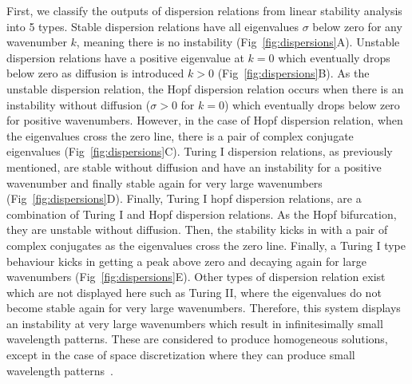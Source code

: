 First, we classify the outputs of dispersion relations from linear stability analysis into 5 types.
Stable dispersion relations have all eigenvalues $\sigma$ below zero for any wavenumber $k$, meaning there is no instability (Fig~\ref{fig:dispersions}A).
Unstable dispersion relations have a positive eigenvalue at $k=0$ which eventually drops below zero as diffusion is introduced $k>0$ (Fig~\ref{fig:dispersions}B).
As the unstable dispersion relation, the Hopf dispersion relation occurs when there is an instability without diffusion ($\sigma>0$ for $k=0$) which eventually drops below zero for positive wavenumbers.
However, in the case of Hopf dispersion relation, when the eigenvalues cross the zero line, there is a pair of complex conjugate eigenvalues (Fig~\ref{fig:dispersions}C).
Turing I dispersion relations, as previously mentioned, are stable without diffusion and have an instability for a positive wavenumber and finally stable again for very large wavenumbers (Fig~\ref{fig:dispersions}D).
Finally, Turing I hopf dispersion relations, are a combination of Turing I and Hopf dispersion relations.
As the Hopf bifurcation, they are unstable without diffusion.
Then, the stability kicks in with a pair of complex conjugates as the eigenvalues cross the zero line.
Finally, a Turing I type behaviour kicks in getting a peak above zero and decaying again for large wavenumbers (Fig~\ref{fig:dispersions}E).
Other types of dispersion relation exist which are not displayed here such as Turing II, where the eigenvalues do not become stable again for very large wavenumbers.
Therefore, this system displays an instability at very large wavenumbers which result in infinitesimally small wavelength patterns.
These are considered to produce homogeneous solutions, except in the case of space discretization where they can produce small wavelength patterns~\parencite{Wang2022}.






